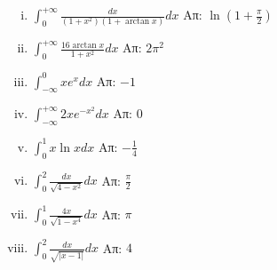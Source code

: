 \documentclass[a4paper,12pt]{article}
\begin{document}
\begin{enumerate}
\begin{enumerate}[i)]
\item $\int_{0}^{+\infty}\frac{dx}{(1+x^2)(1+\arctan{x})}dx$ \hfill Απ: $\ln (1+\frac{\pi}{2})$

\item $\int_{0}^{+\infty}\frac{16\arctan{x}}{1+x^2}dx$ \hfill Απ: $2\pi^2$

\item $\int_{-\infty}^{0}xe^x dx$ \hfill Απ: $-1$

\item $\int_{-\infty}^{+\infty}2xe^{-x^2}dx$ \hfill Απ: $0$

\item $\int_{0}^{1}x\ln x dx$ \hfill Απ: $-\frac{1}{4}$

\item $\int_{0}^{2}\frac{dx}{\sqrt{4-x^2}}dx$ \hfill Απ: $\frac{\pi}{2}$

\item $\int_{0}^{1}\frac{4x}{\sqrt{1-x^4}}dx$ \hfill Απ: $\pi$

\item $\int_{0}^{2}\frac{dx}{\sqrt{|x-1|}}dx$ \hfill Απ: $4$


\end{enumerate}


\end{enumerate}
\end{document}
